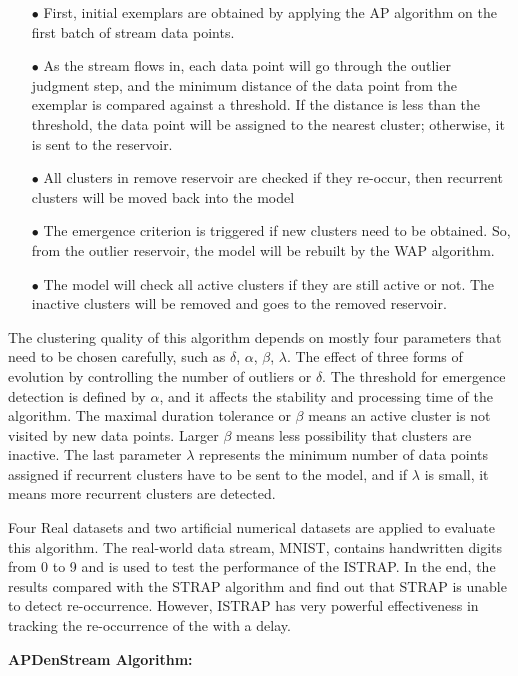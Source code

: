\begin{itemize}
    \item[$\bullet$] First, initial exemplars are obtained by applying the AP algorithm on the first batch of stream data points.
    \item[$\bullet$] As the stream flows in, each data point will go through the outlier judgment step, and the minimum distance of the data point from the exemplar is compared against a threshold. If the distance is less than the threshold, the data point will be assigned to the nearest cluster; otherwise, it is sent to the reservoir.
    \item[$\bullet$] All clusters in remove reservoir are checked if they re-occur, then recurrent clusters will be moved back into the model
    \item[$\bullet$] The emergence criterion is triggered if new clusters need to be obtained. So, from the outlier reservoir, the model will be rebuilt by the WAP algorithm.
    \item[$\bullet$] The model will check all active clusters if they are still active or not. The inactive clusters will be removed and goes to the removed reservoir.
\end{itemize}

The clustering quality of this algorithm depends on mostly four parameters that need to be chosen carefully, such as $\delta$, $\alpha$, $\beta$, $\lambda$. The effect of three forms of evolution by controlling the number of outliers or $\delta$. The threshold for emergence detection is defined by $\alpha$, and it affects the stability and processing time of the algorithm. The maximal duration tolerance or $\beta$ means an active cluster is not visited by new data points. Larger $\beta$ means less possibility that clusters are inactive. The last parameter $\lambda$ represents the minimum number of data points assigned if recurrent clusters have to be sent to the model, and if $\lambda$ is small, it means more recurrent clusters are detected. 

Four Real datasets and two artificial numerical datasets are applied to evaluate this algorithm. The real-world data stream,  MNIST, contains handwritten digits from 0 to 9 and is used to test the performance of the ISTRAP. In the end, the results compared with the STRAP algorithm and find out that STRAP is unable to detect re-occurrence. However, ISTRAP has very powerful effectiveness in tracking the re-occurrence of the with a delay.


\textbf{APDenStream Algorithm:}


